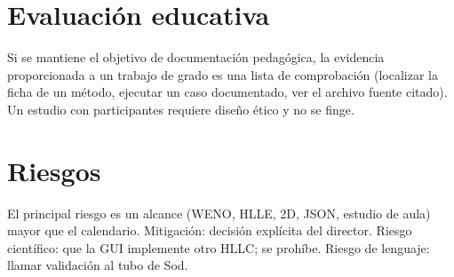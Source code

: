 \section{Evaluación educativa}

Si se mantiene el objetivo de documentación pedagógica, la evidencia proporcionada a un trabajo de grado es una lista de comprobación (localizar la ficha de un método, ejecutar un caso documentado, ver el archivo fuente citado). Un estudio con participantes requiere diseño ético y no se finge.

\section{Riesgos}

El principal riesgo es un alcance (WENO, HLLE, 2D, JSON, estudio de aula) mayor que el calendario. Mitigación: decisión explícita del director. Riesgo científico: que la GUI implemente otro HLLC; se prohíbe. Riesgo de lenguaje: llamar validación al tubo de Sod.
